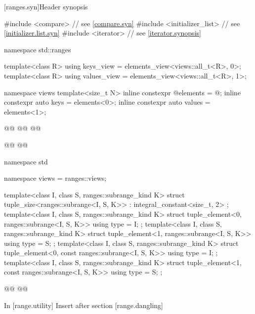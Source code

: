 \documentclass{wg21}
\begin{document}
    
[ranges.syn]{Header  synopsis}
%
\begin{codeblock}
#include <compare>              // see \ref{compare.syn}
#include <initializer_list>     // see \ref{initializer.list.syn}
#include <iterator>             // see \ref{iterator.synopsis}

namespace std::ranges {
    template<class R>
    using keys_view = elements_view<views::all_t<R>, 0>;
    template<class R>
    using values_view = elements_view<views::all_t<R>, 1>;
    
    namespace views {
        template<size_t N>
        inline constexpr @\unspec@ elements = @\unspec@ ;
        inline constexpr auto keys = elements<0>;
        inline constexpr auto values = elements<1>;
    }

    @@
    @@
    @@
    
    @@
    @@
}
namespace std {
    namespace views = ranges::views;
    
    template<class I, class S, ranges::subrange_kind K>
    struct tuple_size<ranges::subrange<I, S, K>>
    : integral_constant<size_t, 2> {};
    template<class I, class S, ranges::subrange_kind K>
    struct tuple_element<0, ranges::subrange<I, S, K>> {
        using type = I;
    };
    template<class I, class S, ranges::subrange_kind K>
    struct tuple_element<1, ranges::subrange<I, S, K>> {
        using type = S;
    };
    template<class I, class S, ranges::subrange_kind K>
    struct tuple_element<0, const ranges::subrange<I, S, K>> {
        using type = I;
    };
    template<class I, class S, ranges::subrange_kind K>
    struct tuple_element<1, const ranges::subrange<I, S, K>> {
        using type = S;
    };

    @@
    @@
}

\end{codeblock}

In [range.utility] Insert after section [range.dangling]
\end{document}
